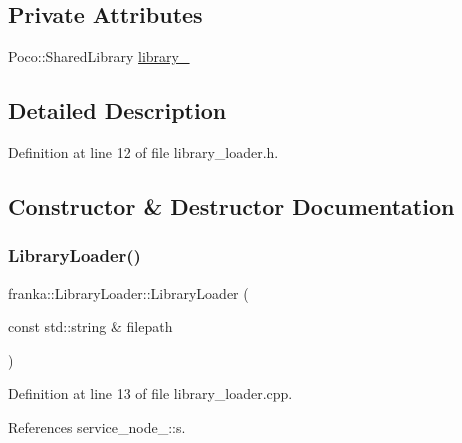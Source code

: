 \subsection*{Private Attributes}
\begin{DoxyCompactItemize}
\item 
Poco\+::\+Shared\+Library \hyperlink{classfranka_1_1LibraryLoader_aa60d8a00447a53d4c754c9959adf39e1}{library\+\_\+}
\end{DoxyCompactItemize}


\subsection{Detailed Description}


Definition at line 12 of file library\+\_\+loader.\+h.



\subsection{Constructor \& Destructor Documentation}
\mbox{\label{classfranka_1_1LibraryLoader_aa971ea69a2dab305b1be14b39e74c4ea}} 
\subsubsection{\texorpdfstring{Library\+Loader()}{LibraryLoader()}}
{\footnotesize\ttfamily franka\+::\+Library\+Loader\+::\+Library\+Loader (\begin{DoxyParamCaption}\item[{const std\+::string \&}]{filepath }\end{DoxyParamCaption})}



Definition at line 13 of file library\+\_\+loader.\+cpp.



References service\+\_\+node\+\_\+::s.


